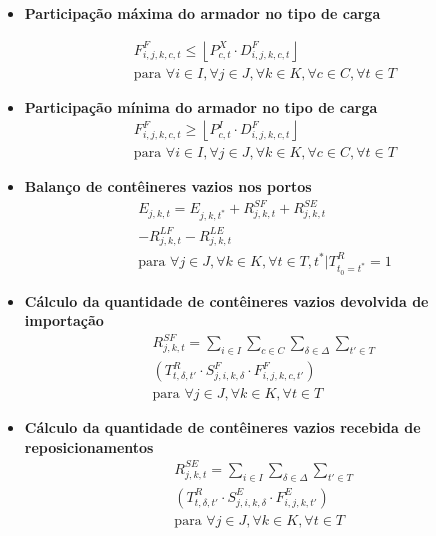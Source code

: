 \documentclass[preprint,10pt,5p]{elsarticle}
\begin{document}
\begin{itemize}

\item\textbf{Participação máxima do armador no tipo de carga}


\begin{multline}
\label{eq:restricao-participacao-maxima}
F_{i,j,k,c,t}^F \leq \left\lfloor P_{c,t}^X \cdot D_{i,j,k,c,t}^F \right\rfloor \\
\text{para } \forall i \in I, \forall j \in J, \forall k \in K, \forall c \in C, \forall t \in T
\end{multline}


\item\textbf{Participação mínima do armador no tipo de carga}
\begin{multline}
\label{eq:restricao-participacao-minima}
F_{i,j,k,c,t}^F \geq \left\lfloor P_{c,t}^I \cdot D_{i,j,k,c,t}^F \right\rfloor \\
\text{para } \forall i \in I, \forall j \in J, \forall k \in K, \forall c \in C, \forall t \in T
\end{multline}

\item\textbf{Balanço de contêineres vazios nos portos}
\begin{multline}
\label{eq:balanco-vazios}
E_{j,k,t} = E_{j,k,t^*} + R_{j,k,t}^{SF} + R_{j,k,t}^{SE} \\
- R_{j,k,t}^{LF} - R_{j,k,t}^{LE} \\
\text{para } \forall j \in J, \forall k \in K, \forall t \in T, t^* | T_{t_0 = t^*}^{R} = 1
\end{multline}

\item\textbf{Cálculo da quantidade de contêineres vazios devolvida de importação}
\begin{multline}
\label{eq:vazios-devolvidos-importacao}
R_{j,k,t}^{SF} = \sum_{i \in I} \sum_{c \in C} \sum_{\delta \in \Delta} \sum_{t' \in T} \\
\left( T_{t, \delta, t'}^{R} \cdot S_{j, i, k, \delta}^{F} \cdot F_{i, j, k, c, t'}^{F} \right) \\
\text{para } \forall j \in J, \forall k \in K, \forall t \in T
\end{multline}

\item\textbf{Cálculo da quantidade de contêineres vazios recebida de reposicionamentos}
\begin{multline}
\label{eq:vazios-devolvidos-reposicionamento}
R_{j,k,t}^{SE} = \sum_{i \in I} \sum_{\delta \in \Delta} \sum_{t' \in T} \\
\left( T_{t, \delta, t'}^{R} \cdot S_{j, i, k, \delta}^{E} \cdot F_{i, j, k, t'}^{E} \right) \\
\text{para } \forall j \in J, \forall k \in K, \forall t \in T
\end{multline}


\end{itemize}
\end{document}
